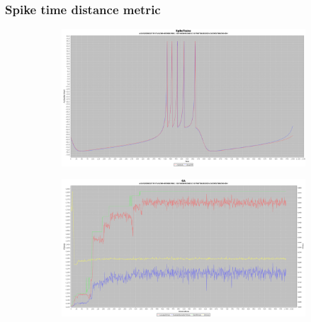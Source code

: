 \documentclass[12pt]{article}
\begin{document}
		\subsubsection{Spike time distance metric}
			\begin{figure}[H]
				\centering
					\begin{subfigure}{.5\textwidth}
						\centering
						\includegraphics[width=\linewidth]{./../images/izzy1/time/plot.png}
						
						\label{fig:sub1a}
					\end{subfigure}%
					\begin{subfigure}{.5\textwidth}
						\centering
						\includegraphics[width=\linewidth]{./../images/izzy1/time/prog.png}
						
						\label{fig:sub1b}
					\end{subfigure}
					
					\label{fig:plot1}
			\end{figure}
			
\end{document}
